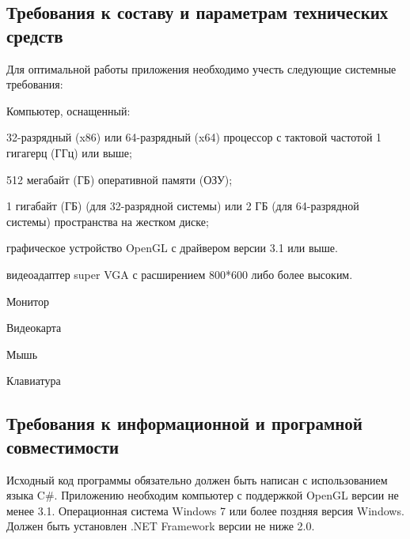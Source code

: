 \subsection{Требования к составу и параметрам технических средств}
Для оптимальной работы приложения необходимо учесть следующие системные требования:
\begin{my_enumerate}
\item Компьютер, оснащенный:
    \begin{my_enumerate}
    \item 32-разрядный (x86) или 64-разрядный (x64) процессор с тактовой частотой 1 гигагерц (ГГц) или выше;
    \item 512 мегабайт (ГБ) оперативной памяти (ОЗУ);
    \item 1 гигабайт (ГБ) (для 32-разрядной системы) или 2 ГБ (для 64-разрядной системы) пространства на жестком диске;
    \item графическое устройство OpenGL с драйвером версии 3.1 или выше.
    \item видеоадаптер super VGA с расширением 800*600 либо более высоким.
    \end{my_enumerate}
\item Монитор
\item Видеокарта
\item Мышь
\item Клавиатура
\end{my_enumerate}


\subsection{Требования к информационной и програмной совместимости}
Исходный код программы обязательно должен быть написан с использованием языка C\#. Приложению необходим компьютер с поддержкой OpenGL версии не менее 3.1. Операционная система Windows 7 или более поздняя версия Windows. Должен быть установлен .NET Framework версии не ниже 2.0.


